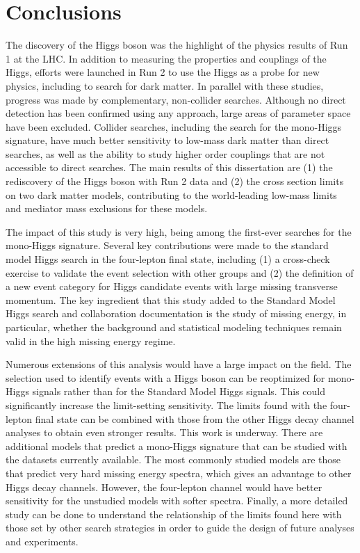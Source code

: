 \chapter{Conclusions}

The discovery of the Higgs boson was the highlight of the physics results of Run 1 at the LHC. In addition to measuring the properties and couplings of the Higgs, efforts were launched in Run 2 to use the Higgs as a probe for new physics, including to search for dark matter. In parallel with these studies, progress was made by complementary, non-collider searches. Although no direct detection has been confirmed using any approach, large areas of parameter space have been excluded. Collider searches, including the search for the mono-Higgs signature, have much better sensitivity to low-mass dark matter than direct searches, as well as the ability to study higher order couplings that are not accessible to direct searches. The main results of this dissertation are (1) the rediscovery of the Higgs boson with Run 2 data and (2) the cross section limits on two dark matter models, contributing to the world-leading low-mass limits and mediator mass exclusions for these models.

The impact of this study is very high, being among the first-ever searches for the mono-Higgs signature. Several key contributions were made to the standard model Higgs search in the four-lepton final state, including (1) a cross-check exercise to validate the event selection with other groups and (2) the definition of a new event category for Higgs candidate events with large missing transverse momentum. The key ingredient that this study added to the Standard Model Higgs search and collaboration documentation is the study of missing energy, in particular, whether the background and statistical modeling techniques remain valid in the high missing energy regime. 

Numerous extensions of this analysis would have a large impact on the field. The selection used to identify events with a Higgs boson can be reoptimized for mono-Higgs signals rather than for the Standard Model Higgs signals. This could significantly increase the limit-setting sensitivity. The limits found with the four-lepton final state can be combined with those from the other Higgs decay channel analyses to obtain even stronger results. This work is underway. There are additional models that predict a mono-Higgs signature that can be studied with the datasets currently available. The most commonly studied models are those that predict very hard missing energy spectra, which gives an advantage to other Higgs decay channels. However, the four-lepton channel would have better sensitivity for the unstudied models with softer spectra. Finally, a more detailed study can be done to understand the relationship of the limits found here with those set by other search strategies in order to guide the design of future analyses and experiments. 

